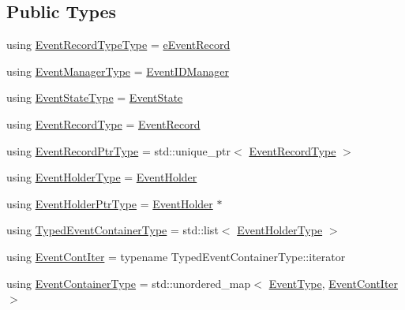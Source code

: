 \subsection*{Public Types}
\begin{DoxyCompactItemize}
\item 
using \hyperlink{structvt_1_1event_1_1_async_event_a4cf6f3c99e69b2efeb5fa9b3ffbcca4a}{Event\+Record\+Type\+Type} = \hyperlink{namespacevt_1_1event_a1ea9fec44d101bf40b8fd786d44ebed9}{e\+Event\+Record}
\item 
using \hyperlink{structvt_1_1event_1_1_async_event_a087519ac9e5ceaf317a2f6f583bfabd6}{Event\+Manager\+Type} = \hyperlink{structvt_1_1event_1_1_event_i_d_manager}{Event\+I\+D\+Manager}
\item 
using \hyperlink{structvt_1_1event_1_1_async_event_a35f2dfb3322fc042d4561ce1e119a0c8}{Event\+State\+Type} = \hyperlink{namespacevt_1_1event_a787aca6361696d96d817a639195c429c}{Event\+State}
\item 
using \hyperlink{structvt_1_1event_1_1_async_event_a5b4ef37db6e5962fdc0e6e0e56e74bc1}{Event\+Record\+Type} = \hyperlink{structvt_1_1event_1_1_event_record}{Event\+Record}
\item 
using \hyperlink{structvt_1_1event_1_1_async_event_a858268f301cb838d33d21cc66232803b}{Event\+Record\+Ptr\+Type} = std\+::unique\+\_\+ptr$<$ \hyperlink{structvt_1_1event_1_1_async_event_a5b4ef37db6e5962fdc0e6e0e56e74bc1}{Event\+Record\+Type} $>$
\item 
using \hyperlink{structvt_1_1event_1_1_async_event_a6b529d829ccb5b12c50c2b1978c41a86}{Event\+Holder\+Type} = \hyperlink{structvt_1_1event_1_1_event_holder}{Event\+Holder}
\item 
using \hyperlink{structvt_1_1event_1_1_async_event_aaa94fd7e3a63b17dc5b5e5751e5d05e8}{Event\+Holder\+Ptr\+Type} = \hyperlink{structvt_1_1event_1_1_event_holder}{Event\+Holder} $\ast$
\item 
using \hyperlink{structvt_1_1event_1_1_async_event_af0397f32fb9d7dd136c544737eeb7796}{Typed\+Event\+Container\+Type} = std\+::list$<$ \hyperlink{structvt_1_1event_1_1_async_event_a6b529d829ccb5b12c50c2b1978c41a86}{Event\+Holder\+Type} $>$
\item 
using \hyperlink{structvt_1_1event_1_1_async_event_a0f9634db3d6887c4a22076f6b9054e93}{Event\+Cont\+Iter} = typename Typed\+Event\+Container\+Type\+::iterator
\item 
using \hyperlink{structvt_1_1event_1_1_async_event_a391e9ac6236bd3dc5c884b8bc7e48257}{Event\+Container\+Type} = std\+::unordered\+\_\+map$<$ \hyperlink{namespacevt_a009267401def7ae8bf201892222d060f}{Event\+Type}, \hyperlink{structvt_1_1event_1_1_async_event_a0f9634db3d6887c4a22076f6b9054e93}{Event\+Cont\+Iter} $>$
\end{DoxyCompactItemize}

